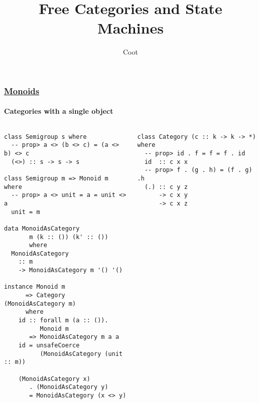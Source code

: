 \documentclass[t,dvipsnames]{beamer}
\author{Coot}
\title{Free Categories and State Machines}
\begin{document}
\begin{frame}
    \titlepage
\end{frame}

\begin{frame}[fragile]
    \frametitle{\underline{Monoids}}
    \framesubtitle{Categories with a single object}
    \begin{columns}[t]
        \begin{column}{0.5\textwidth}
            \begin{verbatim}
class Semigroup s where
  -- prop> a <> (b <> c) = (a <> b) <> c
  (<>) :: s -> s -> s

class Semigroup m => Monoid m where
  -- prop> a <> unit = a = unit <> a
  unit = m

data MonoidAsCategory
       m (k :: ()) (k' :: ())
       where
  MonoidAsCategory
    :: m
    -> MonoidAsCategory m '() '()

instance Monoid m
      => Category (MonoidAsCategory m)
      where
    id :: forall m (a :: ()).
          Monoid m
       => MonoidAsCategory m a a
    id = unsafeCoerce
          (MonoidAsCategory (unit :: m))

    (MonoidAsCategory x)
       . (MonoidAsCategory y)
       = MonoidAsCategory (x <> y)

            \end{verbatim}
        \end{column}
        \begin{column}{0.5\textwidth}
          \begin{verbatim}
class Category (c :: k -> k -> *) where
  -- prop> id . f = f = f . id
  id  :: c x x
  -- prop> f . (g . h) = (f . g) .h
  (.) :: c y z
      -> c x y
      -> c x z
            \end{verbatim}
        \end{column}
    \end{columns}
\end{frame}
\end{document}
